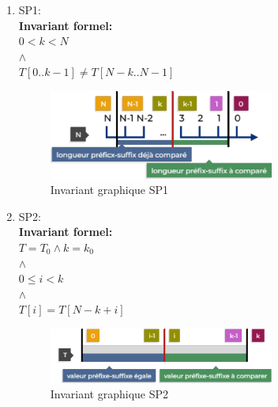 \begin{enumerate}
    \item SP1: \\
        \textbf{Invariant formel:} \\
            $0 < k < N$ \\
            $\land$ \\
            $T[0..k-1] \neq T[N-k..N-1]$ \\

        \begin{figure}[h]
            \centering
            \includegraphics[width=0.7\textwidth]{invariant_1.pdf}
            \caption{Invariant graphique SP1}
        \end{figure}

    \item SP2: \\
        \textbf{Invariant formel:} \\
            $T = T_0 \land k = k_0$ \\
            $\land$ \\
            $0 \leq i < k$ \\
            $\land$ \\
            $T[i] = T[N - k + i]$ \\

        \begin{figure}[h]
            \centering
            \includegraphics[width=0.7\textwidth]{invariant_2.pdf}
            \caption{Invariant graphique SP2}
        \end{figure}

\end{enumerate}
